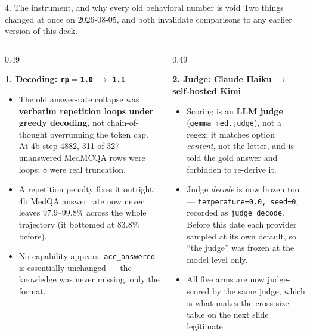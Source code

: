 \documentclass[aspectratio=169,10pt]{beamer}
\newcommand{\good}[1]{\textcolor{up}{#1}}
\newcommand{\bad}[1]{\textcolor{down}{#1}}
\begin{document}
\begin{frame}{4. The instrument, and why every old behavioral number is void}
  \small
  \bad{Two things changed at once on 2026-08-05}, and both invalidate
  comparisons to any earlier version of this deck.

  \vspace{0.4em}
  \begin{columns}[T]
    \begin{column}{0.49\textwidth}
      {\footnotesize
      \textbf{1. Decoding: \texttt{rp}$=$\texttt{1.0} $\rightarrow$
      \texttt{1.1}}
      \begin{itemize}\setlength{\itemsep}{0.2em}
        \item The old answer-rate collapse was \textbf{verbatim repetition
          loops under greedy decoding}, not chain-of-thought overrunning the
          token cap. At 4b step-4882, 311 of 327 unanswered MedMCQA rows were
          loops; 8 were real truncation.
        \item A repetition penalty fixes it outright: 4b MedQA answer rate now
          never leaves $97.9$--$99.8\%$ across the whole trajectory (it
          bottomed at $83.8\%$ before).
        \item \good{No capability appears.} \texttt{acc\_answered} is
          essentially unchanged --- the knowledge was never missing, only the
          format.
      \end{itemize}}
    \end{column}
    \begin{column}{0.49\textwidth}
      {\footnotesize
      \textbf{2. Judge: Claude Haiku $\rightarrow$ self-hosted Kimi}
      \begin{itemize}\setlength{\itemsep}{0.2em}
        \item Scoring is an \textbf{LLM judge} (\texttt{gemma\_med.judge}), not
          a regex: it matches option \emph{content}, not the letter, and is told
          the gold answer and forbidden to re-derive it.
        \item Judge \emph{decode} is now frozen too --- \texttt{temperature=0.0,
          seed=0}, recorded as \texttt{judge\_decode}. Before this date each
          provider sampled at its own default, so ``the judge'' was frozen at
          the model level only.
        \item \good{All five arms are now judge-scored by the same judge},
          which is what makes the cross-size table on the next slide legitimate.
      \end{itemize}}
    \end{column}
  \end{columns}


\end{frame}
\end{document}
